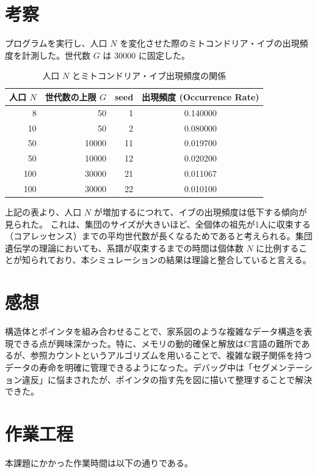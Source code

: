 \documentclass[a4paper,11pt]{jsarticle}
\begin{document}
\section{考察}
プログラムを実行し、人口 $N$ を変化させた際のミトコンドリア・イブの出現頻度を計測した。世代数 $G$ は $30000$ に固定した。

\begin{table}[h]
\centering
\caption{人口 $N$ とミトコンドリア・イブ出現頻度の関係}
\begin{tabular}{rrrc}
\toprule
人口 $N$ & 世代数の上限 $G$ & seed & 出現頻度 (Occurrence Rate) \\
\midrule
8 & 50 & 1 & 0.140000 \\
10 & 50 & 2 & 0.080000 \\
50 & 10000 & 11 & 0.019700 \\
50 & 10000 & 12 & 0.020200 \\
100 & 30000 & 21 & 0.011067 \\
100 & 30000 & 22 & 0.010100 \\
\bottomrule
\end{tabular}
\end{table}

上記の表より、人口 $N$ が増加するにつれて、イブの出現頻度は低下する傾向が見られた。
これは、集団のサイズが大きいほど、全個体の祖先が1人に収束する（コアレッセンス）までの平均世代数が長くなるためであると考えられる。集団遺伝学の理論においても、系譜が収束するまでの時間は個体数 $N$ に比例することが知られており、本シミュレーションの結果は理論と整合していると言える。

\section{感想}
構造体とポインタを組み合わせることで、家系図のような複雑なデータ構造を表現できる点が興味深かった。特に、メモリの動的確保と解放はC言語の難所であるが、参照カウントというアルゴリズムを用いることで、複雑な親子関係を持つデータの寿命を明確に管理できるようになった。デバッグ中は「セグメンテーション違反」に悩まされたが、ポインタの指す先を図に描いて整理することで解決できた。

\section{作業工程}
本課題にかかった作業時間は以下の通りである。
\end{document}
